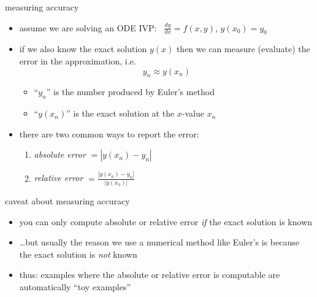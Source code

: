 \documentclass{beamer}
\newcommand{\ds}{\displaystyle}
\begin{document}
\begin{frame}{measuring accuracy}

\begin{itemize}
\item assume we are solving an ODE IVP:  \, $\frac{dy}{dx} = f(x,y)$, $y(x_0)=y_0$
\item if we \alert{also know the exact solution $y(x)$} then we can measure (evaluate) the error in the approximation, i.e.
    $$y_n \approx y(x_n)$$
    \vspace{-4mm}
    \begin{itemize}
    \item ``$y_n$'' is the number produced by Euler's method
    \item ``$y(x_n)$'' is the exact solution at the $x$-value $x_n$
    \end{itemize}
\item there are two common ways to report the error:
    \begin{enumerate}
    \medskip
    \item \emph{absolute error} $=|y(x_n) - y_n|$
    
    \medskip
    \item \emph{relative error} $\ds=\frac{|y(x_n) - y_n|}{|y(x_n)|}$
    \end{enumerate}
\end{itemize}
\end{frame}


\begin{frame}{caveat about measuring accuracy}

\begin{itemize}
\item you can only compute absolute or relative error \emph{if} the exact solution is known
\item \dots but usually the reason we use a numerical method like Euler's is because the exact solution is \emph{not} known
\item thus: examples where the absolute or relative error is computable are automatically ``toy examples''
\end{itemize}
\end{frame}
\end{document}
